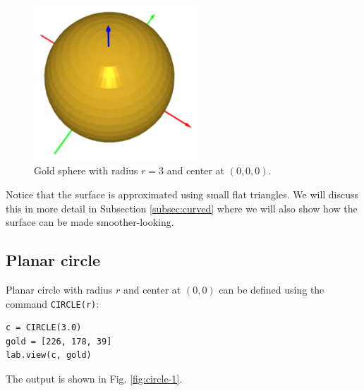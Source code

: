 \begin{figure}[!ht]
\begin{center}
\includegraphics[width=0.55\textwidth]{img/sphere-1.png}
\end{center}
\vspace{-4mm}
\caption{Gold sphere with radius $r = 3$ and center at $(0, 0, 0)$.}
\label{fig:sphere-1}
\end{figure}
\noindent
Notice that the surface is approximated using small flat triangles. 
We will discuss this in more detail in Subsection \ref{subsec:curved}
where we will also show how the surface can be made smoother-looking.


\subsection{Planar circle}

Planar circle with radius $r$ and center at $(0, 0)$ can be defined 
using the command {\tt CIRCLE(r)}:\\

\begin{bbox}
\begin{verbatim}
c = CIRCLE(3.0)
gold = [226, 178, 39]
lab.view(c, gold)
\end{verbatim}
\end{bbox}
\vspace{6mm}

\noindent
\noindent
The output is shown in Fig. \ref{fig:circle-1}.
\newpage

